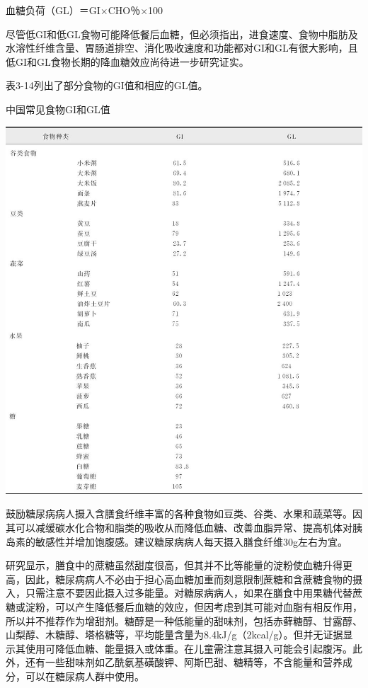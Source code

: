 血糖负荷（GL）＝GI×CHO％×100

尽管低GI和低GL食物可能降低餐后血糖，但必须指出，进食速度、食物中脂肪及水溶性纤维含量、胃肠道排空、消化吸收速度和功能都对GI和GL有很大影响，且低GI和GL食物长期的降血糖效应尚待进一步研究证实。

表3-14列出了部分食物的GI值和相应的GL值。

\begin{table}[htbp]
\centering
\caption{中国常见食物GI和GL值}
\label{tab3-14}
\includegraphics{./images/Image00030.jpg}
\end{table}

鼓励糖尿病病人摄入含膳食纤维丰富的各种食物如豆类、谷类、水果和蔬菜等。因其可以减缓碳水化合物和脂类的吸收从而降低血糖、改善血脂异常、提高机体对胰岛素的敏感性并增加饱腹感。建议糖尿病病人每天摄入膳食纤维30g左右为宜。

研究显示，膳食中的蔗糖虽然甜度很高，但其并不比等能量的淀粉使血糖升得更高，因此，糖尿病病人不必由于担心高血糖加重而刻意限制蔗糖和含蔗糖食物的摄入，只需注意不要因此摄入过多能量。对糖尿病病人，如果在膳食中用果糖代替蔗糖或淀粉，可以产生降低餐后血糖的效应，但因考虑到其可能对血脂有相反作用，所以并不推荐作为增甜剂。糖醇是一种低能量的甜味剂，包括赤藓糖醇、甘露醇、山梨醇、木糖醇、塔格糖等，平均能量含量为8.4kJ/g（2kcal/g）。但并无证据显示其使用可降低血糖、能量摄入或体重。在儿童需注意其摄入可能会引起腹泻。此外，还有一些甜味剂如乙酰氨基磺酸钾、阿斯巴甜、糖精等，不含能量和营养成分，可以在糖尿病人群中使用。

